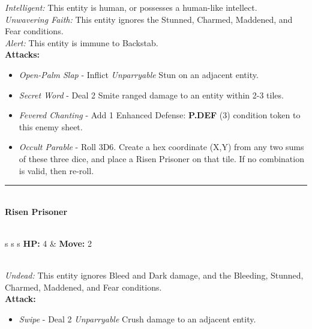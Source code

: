 \emph{Intelligent:} This entity is human, or possesses a human-like intellect.\\

\emph{Unwavering Faith:} This entity ignores the Stunned, Charmed, Maddened, and Fear conditions.\\

\emph{Alert:} This entity is immune to Backstab.\\

\textbf{Attacks:}
\begin{itemize}
\item \emph{Open-Palm Slap} - Inflict \emph{Unparryable} Stun on an adjacent entity.
\item \emph{Secret Word} - Deal 2 Smite ranged damage to an entity within 2-3 tiles.
\item \emph{Fevered Chanting} - Add 1 Enhanced Defense: \textbf{P.DEF} (3) condition token to this enemy sheet.
\item \emph{Occult Parable} - Roll 3D6. Create a hex coordinate (X,Y) from any two sums of these three dice, and place a Risen Prisoner on that tile. If no combination is valid, then re-roll.
\end{itemize}
\hrule
\ \\
{\large \textbf{Risen Prisoner}}\\\\
\begin{tabular}{s s s}
\textbf{HP:} 4 & \textbf{Move:} 2\\
\end{tabular}\\

\emph{Undead:} This entity ignores Bleed and Dark damage, and the Bleeding, Stunned, Charmed, Maddened, and Fear conditions.\\

\textbf{Attack:}
\begin{itemize}
\item \emph{Swipe} - Deal 2 \emph{Unparryable} Crush damage to an adjacent entity.
\end{itemize}

\pagebreak

